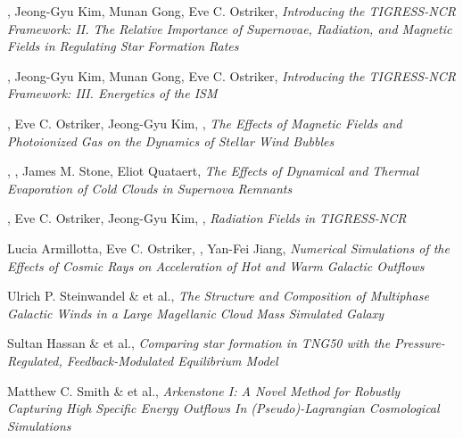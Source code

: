 \item \boldname{}, Jeong-Gyu Kim, Munan Gong, Eve C. Ostriker, \textit{Introducing the TIGRESS-NCR Framework: II. The Relative Importance of Supernovae, Radiation, and Magnetic Fields in Regulating Star Formation Rates}
\item \boldname{}, Jeong-Gyu Kim, Munan Gong, Eve C. Ostriker, \textit{Introducing the TIGRESS-NCR Framework: III. Energetics of the ISM}
\item {}, Eve C. Ostriker, Jeong-Gyu Kim, \boldname{}, \textit{The Effects of Magnetic Fields and Photoionized Gas on the Dynamics of Stellar Wind Bubbles}
\item {}, \boldname{}, James M. Stone, Eliot Quataert, \textit{The Effects of Dynamical and Thermal Evaporation of Cold Clouds in Supernova Remnants}
\item {}, Eve C. Ostriker, Jeong-Gyu Kim, \boldname{}, \textit{Radiation Fields in TIGRESS-NCR}
\item Lucia Armillotta, Eve C. Ostriker, \boldname{}, Yan-Fei Jiang, \textit{Numerical Simulations of
the Effects of Cosmic Rays on Acceleration of Hot and Warm Galactic Outflows}
\item Ulrich P. Steinwandel \& \boldname{} et al., \textit{The Structure and Composition of Multiphase Galactic Winds in a Large Magellanic Cloud Mass Simulated Galaxy}
\item Sultan Hassan \& \boldname{} et al., \textit{Comparing star formation in TNG50 with the  Pressure-Regulated, Feedback-Modulated Equilibrium Model}
\item Matthew C. Smith \& \boldname{} et al., \textit{Arkenstone I: A Novel Method for Robustly Capturing High Specific Energy Outflows In (Pseudo)-Lagrangian Cosmological Simulations}